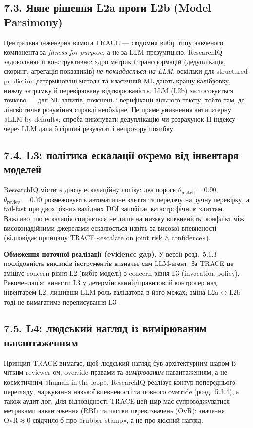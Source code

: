 \subsection*{7.3. Явне рішення L2a проти L2b (Model Parsimony)}

Центральна інженерна вимога TRACE --- свідомий вибір типу навченого компонента за \emph{fitness for purpose}, а не за LLM-презумпцією. ResearchIQ задовольняє її конструктивно: ядро метрик і трансформацій (дедуплікація, скоринг, агрегація показників) \emph{не покладається на LLM}, оскільки для structured prediction детерміновані методи та класичний ML дають кращу калібровку, нижчу затримку й перевірювану відтворюваність. LLM (L2b) застосовується точково --- для NL-запитів, пояснень і верифікації вільного тексту, тобто там, де лінгвістичне розуміння справді необхідне. Це пряме уникнення антипатерну «LLM-by-default»: спроба виконувати дедуплікацію чи розрахунок H-індексу через LLM дала б гірший результат і непрозору похибку.

\subsection*{7.4. L3: політика ескалації окремо від інвентаря моделей}

ResearchIQ містить діючу ескалаційну логіку: два пороги $\theta_{\mathrm{match}}=0.90$, $\theta_{\mathrm{review}}=0.70$ розмежовують автоматичне злиття та передачу на ручну перевірку, а fail-fast при двох різних валідних DOI запобігає катастрофічним злиттям. Важливо, що ескалація спирається не лише на низьку впевненість: конфлікт між високонадійними джерелами ескалюється навіть за високої впевненості (відповідає принципу TRACE «escalate on joint risk $\wedge$ confidence»).

\textbf{Обмеження поточної реалізації (evidence gap).} У версії розд.~5.1.3 послідовність викликів інструментів визначає сам LLM-агент. За TRACE це змішує concern рівня L2 (вибір моделі) з concern рівня L3 (invocation policy). Рекомендація: винести L3 у детермінований/правиловий контролер над інвентарем L2, лишивши LLM роль валідатора в його межах; зміна L2a$\leftrightarrow$L2b тоді не вимагатиме переписування L3.

\subsection*{7.5. L4: людський нагляд із вимірюваним навантаженням}

Принцип TRACE вимагає, щоб людський нагляд був архітектурним шаром із чітким reviewer-ом, override-правами та \emph{вимірюваним} навантаженням, а не косметичним «human-in-the-loop». ResearchIQ реалізує контур попереднього перегляду, маркування низької впевненості та повного override (розд.~5.3.4), а також аудит-лог. Для відповідності TRACE цей шар має супроводжуватися метриками навантаження (RBI) та частки перевизначень (OvR): значення $\mathrm{OvR}\approx 0$ свідчило б про «rubber-stamp», а не про якісний нагляд.

